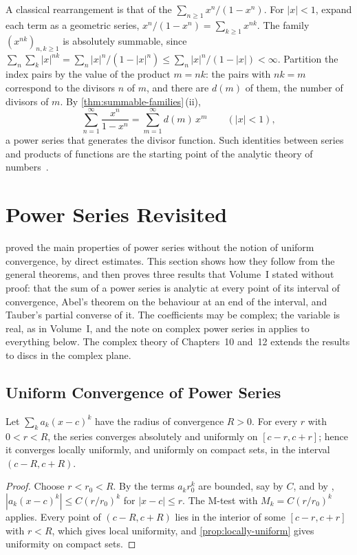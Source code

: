 A classical rearrangement is that of the  $\sum_{n\ge1}x^n/(1-x^n)$. For $|x|<1$, expand each term as a geometric series, $x^n/(1-x^n)=\sum_{k\ge1}x^{nk}$. The family $(x^{nk})_{n,k\ge1}$ is absolutely summable, since $\sum_n\sum_k|x|^{nk}=\sum_n|x|^n/(1-|x|^n)\le\sum_n|x|^n/(1-|x|)<\infty$. Partition the index pairs by the value of the product $m=nk$: the pairs with $nk=m$ correspond to the divisors $n$ of $m$, and there are $d(m)$ of them, the number of divisors of $m$. By \cref{thm:summable-families}\,(ii),
\[
\sum_{n=1}^\infty\frac{x^n}{1-x^n}=\sum_{m=1}^\infty d(m)\,x^m\qquad(|x|<1),
\]
a power series that generates the divisor function. Such identities between series and products of functions are the starting point of the analytic theory of numbers~\cite{hardywright2008}.

\section{Power Series Revisited}
\label{sec:power-series-revisited}

 proved the main properties of power series without the notion of uniform convergence, by direct estimates. This section shows how they follow from the general theorems, and then proves three results that Volume~I stated without proof: that the sum of a power series is analytic at every point of its interval of convergence, Abel's theorem on the behaviour at an end of the interval, and Tauber's partial converse of it. The coefficients may be complex; the variable is real, as in Volume~I, and the note on complex power series in  applies to everything below. The complex theory of Chapters~10 and~12 extends the results to discs in the complex plane.

\subsection{Uniform Convergence of Power Series}

\begin{proposition}
\label{prop:power-series-uniform}
Let $\sum_ka_k(x-c)^k$ have the radius of convergence $R>0$. For every $r$ with $0<r<R$, the series converges absolutely and uniformly on $[c-r,c+r]$; hence it converges locally uniformly, and uniformly on compact sets, in the interval $(c-R,c+R)$.
\end{proposition}

\begin{proof}
Choose $r<r_0<R$. By  the terms $a_kr_0^k$ are bounded, say by $C$, and by , $|a_k(x-c)^k|\le C(r/r_0)^k$ for $|x-c|\le r$. The M-test with $M_k=C(r/r_0)^k$ applies. Every point of $(c-R,c+R)$ lies in the interior of some $[c-r,c+r]$ with $r<R$, which gives local uniformity, and \cref{prop:locally-uniform} gives uniformity on compact sets.
\end{proof}

